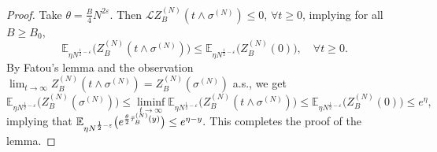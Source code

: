 \documentclass[11pt, reqno]{article}
\numberwithin{equation}{section}
\numberwithin{theorem}{section}
\begin{document}
\begin{appendix}
\begin{proof}
Take $\theta=\frac{B}{4}N^{2\varepsilon}$.
Then $\mathcal{L}Z^{(N)}_B(t\wedge \sigma^{(N)})\leq 0$, $\forall t\geq 0$, implying for all $B \ge B_0$,
$$\mathbb{E}_{\eta N^{\frac{1}{2}-\varepsilon}}\big(Z^{(N)}_B(t\wedge \sigma^{(N)})\big)\leq \mathbb{E}_{\eta N^{\frac{1}{2}-\varepsilon}}\big(Z^{(N)}_B(0)\big),\quad \forall t\geq 0.$$
By Fatou's lemma and the observation $\lim_{t\rightarrow\infty}Z^{(N)}_B(t\wedge \sigma^{(N)})=Z^{(N)}_B(\sigma^{(N)})$ a.s., we get
$$\mathbb{E}_{\eta N^{\frac{1}{2}-\varepsilon}}\big(Z^{(N)}_B(\sigma^{(N)})\big)\leq \liminf_{t\rightarrow\infty}\mathbb{E}_{\eta N^{\frac{1}{2}-\varepsilon}}\big(Z^{(N)}_B(t\wedge \sigma^{(N)})\big)\leq \mathbb{E}_{\eta N^{\frac{1}{2}-\varepsilon}}\big(Z^{(N)}_B(0)\big) \le e^{\eta},$$
implying that
$\mathbb{E}_{\eta N^{\frac{1}{2}-\varepsilon}}\big(e^{\frac{\theta}{2} \Bar{\tau}^{(N)}_B(y)}\big)\leq e^{\eta-y}.$
This completes the proof of the lemma.
\end{proof}




\end{appendix}
\end{document}
